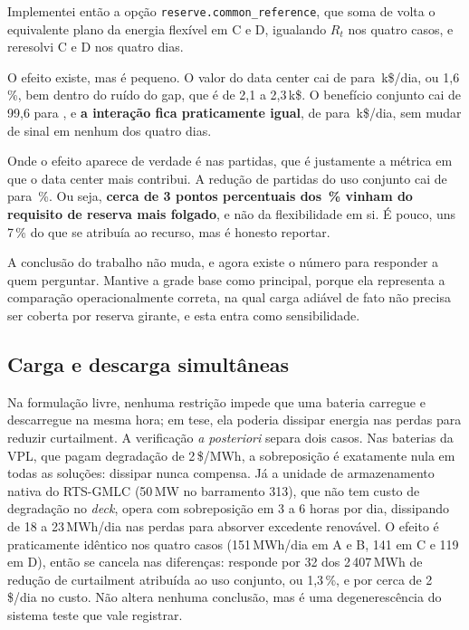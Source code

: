 \documentclass[11pt,a4paper]{article}
\begin{document}
Implementei então a opção \texttt{reserve.common\_reference}, que soma de volta o equivalente plano da
energia flexível em C e D, igualando $R_t$ nos quatro casos, e reresolvi C e D nos quatro dias.

\begin{table}[htbp]
\centering\small
\caption{Grade base contra requisito de reserva idêntico nos quatro casos (k\$/dia).}
\tabreserva
\end{table}

O efeito existe, mas é pequeno. O valor do data center cai de \numdCplano{} para
\numdCresref{}\,k\$/dia, ou 1{,}6\,\%, bem dentro do ruído do gap, que é de 2{,}1 a 2{,}3\,k\$. O
benefício conjunto cai de 99{,}6 para \numdDresref{}, e \textbf{a interação fica praticamente igual}, de
\numIbase{} para \numIresref{}\,k\$/dia, sem mudar de sinal em nenhum dos quatro dias.

Onde o efeito aparece de verdade é nas partidas, que é justamente a métrica em que o data center mais
contribui. A redução de partidas do uso conjunto cai de \numredsubase{} para \numredsuDresref{}\,\%. Ou
seja, \textbf{cerca de 3 pontos percentuais dos \numredsubase{}\,\% vinham do requisito de reserva mais
folgado}, e não da flexibilidade em si. É pouco, uns 7\,\% do que se atribuía ao recurso, mas é honesto
reportar.

A conclusão do trabalho não muda, e agora existe o número para responder a quem perguntar. Mantive a
grade base como principal, porque ela representa a comparação operacionalmente correta, na qual carga
adiável de fato não precisa ser coberta por reserva girante, e esta entra como sensibilidade.

\subsection{Carga e descarga simultâneas}

Na formulação livre, nenhuma restrição impede que uma bateria carregue e descarregue na mesma hora; em
tese, ela poderia dissipar energia nas perdas para reduzir curtailment. A verificação \emph{a posteriori}
separa dois casos. Nas baterias da VPL, que pagam degradação de 2\,\$/MWh, a sobreposição é exatamente
nula em todas as soluções: dissipar nunca compensa. Já a unidade de armazenamento nativa do RTS-GMLC
(50\,MW no barramento 313), que não tem custo de degradação no \emph{deck}, opera com sobreposição em 3
a 6 horas por dia, dissipando de 18 a 23\,MWh/dia nas perdas para absorver excedente renovável. O efeito
é praticamente idêntico nos quatro casos (151\,MWh/dia em A e B, 141 em C e 119 em D), então se cancela
nas diferenças: responde por 32 dos 2\,407\,MWh de redução de curtailment atribuída ao uso conjunto, ou
1{,}3\,\%, e por cerca de 2\,\$/dia no custo. Não altera nenhuma conclusão, mas é uma degenerescência do
sistema teste que vale registrar.
\end{document}
